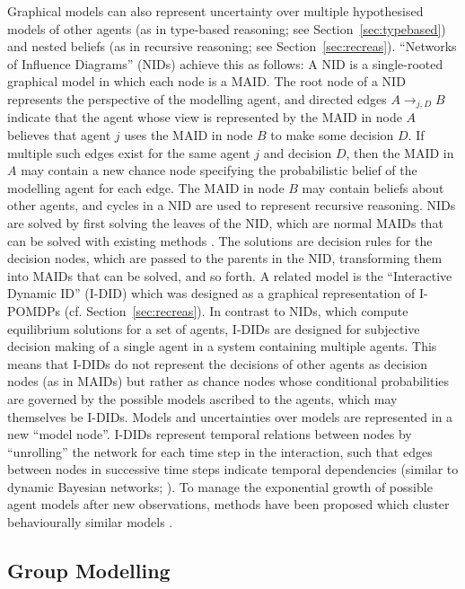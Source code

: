 \documentclass[final,1p,times,authoryear]{elsarticle}
\begin{document}
Graphical models can also represent uncertainty over multiple hypothesised models of other agents (as in type-based reasoning; see Section~\ref{sec:typebased}) and nested beliefs (as in recursive reasoning; see Section~\ref{sec:recreas}). ``Networks of Influence Diagrams'' (NIDs) \citep{gp2008,gp2003} achieve this as follows: A NID is a single-rooted graphical model in which each node is a MAID. The root node of a NID represents the perspective of the modelling agent, and directed edges $A \rightarrow_{j,D} B$ indicate that the agent whose view is represented by the MAID in node $A$ believes that agent $j$ uses the MAID in node $B$ to make some decision $D$. If multiple such edges exist for the same agent $j$ and decision $D$, then the MAID in $A$ may contain a new chance node specifying the probabilistic belief of the modelling agent for each edge. The MAID in node $B$ may contain beliefs about other agents, and cycles in a NID are used to represent recursive reasoning. NIDs are solved by first solving the leaves of the NID, which are normal MAIDs that can be solved with existing methods \citep{kb2003}. The solutions are decision rules for the decision nodes, which are passed to the parents in the NID, transforming them into MAIDs that can be solved, and so forth. A related model is the ``Interactive Dynamic ID'' (I-DID) \citep{dzc2009} which was designed as a graphical representation of I-POMDPs \citep{gd2005} (cf. Section~\ref{sec:recreas}). In contrast to NIDs, which compute equilibrium solutions for a set of agents, I-DIDs are designed for subjective decision making of a single agent in a system containing multiple agents. This means that I-DIDs do not represent the decisions of other agents as decision nodes (as in MAIDs) but rather as chance nodes whose conditional probabilities are governed by the possible models ascribed to the agents, which may themselves be I-DIDs. Models and uncertainties over models are represented in a new ``model node''. I-DIDs represent temporal relations between nodes by ``unrolling'' the network for each time step in the interaction, such that edges between nodes in successive time steps indicate temporal dependencies (similar to dynamic Bayesian networks; \citet{dk1989}). To manage the exponential growth of possible agent models after new observations, methods have been proposed which cluster behaviourally similar models \citep{zd2012,dcz2010,dzc2009}.


		\subsection{\bf Group Modelling} \label{sec:groupmod}
\end{document}
